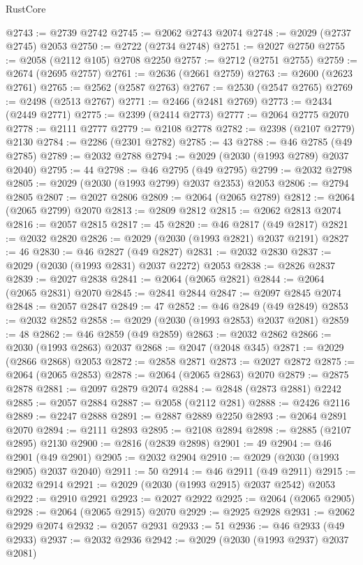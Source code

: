 \begin{lexlean}{RustCore}
\begin{coremodule}
@2743 := @2739 @2742
@2745 := @2062 @2743 @2074
@2748 := @2029 (@2737 @2745) @2053
@2750 := @2722 (@2734 @2748)
@2751 := @2027 @2750
@2755 := @2058 (@2112 @105) @2708 @2250
@2757 := @2712 (@2751 @2755)
@2759 := @2674 (@2695 @2757)
@2761 := @2636 (@2661 @2759)
@2763 := @2600 (@2623 @2761)
@2765 := @2562 (@2587 @2763)
@2767 := @2530 (@2547 @2765)
@2769 := @2498 (@2513 @2767)
@2771 := @2466 (@2481 @2769)
@2773 := @2434 (@2449 @2771)
@2775 := @2399 (@2414 @2773)
@2777 := @2064 @2775 @2070
@2778 := @2111 @2777
@2779 := @2108 @2778
@2782 := @2398 (@2107 @2779) @2130
@2784 := @2286 (@2301 @2782)
@2785 := 43
@2788 := @46 @2785 (@49 @2785)
@2789 := @2032 @2788
@2794 := @2029 (@2030 (@1993 @2789) @2037 @2040)
@2795 := 44
@2798 := @46 @2795 (@49 @2795)
@2799 := @2032 @2798
@2805 := @2029 (@2030 (@1993 @2799) @2037 @2353) @2053
@2806 := @2794 @2805
@2807 := @2027 @2806
@2809 := @2064 (@2065 @2789)
@2812 := @2064 (@2065 @2799) @2070
@2813 := @2809 @2812
@2815 := @2062 @2813 @2074
@2816 := @2057 @2815
@2817 := 45
@2820 := @46 @2817 (@49 @2817)
@2821 := @2032 @2820
@2826 := @2029 (@2030 (@1993 @2821) @2037 @2191)
@2827 := 46
@2830 := @46 @2827 (@49 @2827)
@2831 := @2032 @2830
@2837 := @2029 (@2030 (@1993 @2831) @2037 @2272) @2053
@2838 := @2826 @2837
@2839 := @2027 @2838
@2841 := @2064 (@2065 @2821)
@2844 := @2064 (@2065 @2831) @2070
@2845 := @2841 @2844
@2847 := @2097 @2845 @2074
@2848 := @2057 @2847
@2849 := 47
@2852 := @46 @2849 (@49 @2849)
@2853 := @2032 @2852
@2858 := @2029 (@2030 (@1993 @2853) @2037 @2081)
@2859 := 48
@2862 := @46 @2859 (@49 @2859)
@2863 := @2032 @2862
@2866 := @2030 (@1993 @2863) @2037
@2868 := @2047 (@2048 @345)
@2871 := @2029 (@2866 @2868) @2053
@2872 := @2858 @2871
@2873 := @2027 @2872
@2875 := @2064 (@2065 @2853)
@2878 := @2064 (@2065 @2863) @2070
@2879 := @2875 @2878
@2881 := @2097 @2879 @2074
@2884 := @2848 (@2873 @2881) @2242
@2885 := @2057 @2884
@2887 := @2058 (@2112 @281)
@2888 := @2426 @2116
@2889 := @2247 @2888
@2891 := @2887 @2889 @2250
@2893 := @2064 @2891 @2070
@2894 := @2111 @2893
@2895 := @2108 @2894
@2898 := @2885 (@2107 @2895) @2130
@2900 := @2816 (@2839 @2898)
@2901 := 49
@2904 := @46 @2901 (@49 @2901)
@2905 := @2032 @2904
@2910 := @2029 (@2030 (@1993 @2905) @2037 @2040)
@2911 := 50
@2914 := @46 @2911 (@49 @2911)
@2915 := @2032 @2914
@2921 := @2029 (@2030 (@1993 @2915) @2037 @2542) @2053
@2922 := @2910 @2921
@2923 := @2027 @2922
@2925 := @2064 (@2065 @2905)
@2928 := @2064 (@2065 @2915) @2070
@2929 := @2925 @2928
@2931 := @2062 @2929 @2074
@2932 := @2057 @2931
@2933 := 51
@2936 := @46 @2933 (@49 @2933)
@2937 := @2032 @2936
@2942 := @2029 (@2030 (@1993 @2937) @2037 @2081)

\end{coremodule}
\end{lexlean}

